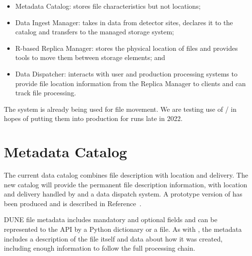 \documentclass[../main-v1.tex]{subfiles}
\begin{document}
\begin{itemize}
\item Metadata Catalog: stores file characteristics but not locations;    
    \item Data Ingest Manager: takes in data from detector sites, declares it to the catalog and transfers to the managed storage system;
    \item R-based Replica Manager: stores the physical location of files and provides tools to move them between storage elements; and
    \item Data Dispatcher: interacts with user and production processing systems%
    to provide file location information from the Replica Manager to clients and can track file processing. 
\end{itemize}

The  system is already being used for file movement.  We are testing use of / in hopes of putting them into production for  runs late in 2022. 


\section{Metadata Catalog }

The current  data catalog combines file description with location and delivery.  The new  catalog will provide the permanent file description information, with location and delivery handled by  and a data dispatch system. 
A prototype version of  has been produced and is described in Reference~\cite{Mandrichenko:2021spd}. 

DUNE file metadata includes mandatory and optional fields and can be represented to the API by a Python dictionary or a  file. 
As with , the metadata includes a description of the file itself and data about how it was created, including enough information to follow the full processing chain.   
\end{document}
